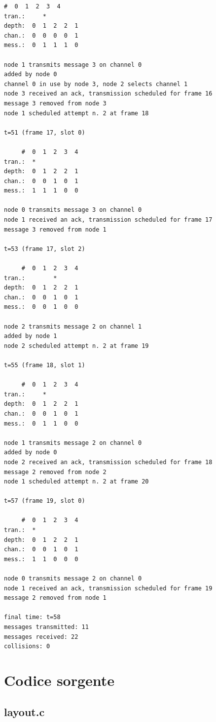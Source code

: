 \documentclass[a4paper,12pt]{article}
\theoremstyle{definition}
\begin{document}
\begin{Verbatim}[fontsize=\footnotesize]
     #  0  1  2  3  4 
tran.:     *          
depth:  0  1  2  2  1 
chan.:  0  0  0  0  1 
mess.:  0  1  1  1  0 

node 1 transmits message 3 on channel 0
added by node 0
channel 0 in use by node 3, node 2 selects channel 1
node 3 received an ack, transmission scheduled for frame 16
message 3 removed from node 3
node 1 scheduled attempt n. 2 at frame 18

t=51 (frame 17, slot 0)

     #  0  1  2  3  4 
tran.:  *             
depth:  0  1  2  2  1 
chan.:  0  0  1  0  1 
mess.:  1  1  1  0  0 

node 0 transmits message 3 on channel 0
node 1 received an ack, transmission scheduled for frame 17
message 3 removed from node 1

t=53 (frame 17, slot 2)

     #  0  1  2  3  4 
tran.:        *       
depth:  0  1  2  2  1 
chan.:  0  0  1  0  1 
mess.:  0  0  1  0  0 

node 2 transmits message 2 on channel 1
added by node 1
node 2 scheduled attempt n. 2 at frame 19

t=55 (frame 18, slot 1)

     #  0  1  2  3  4 
tran.:     *          
depth:  0  1  2  2  1 
chan.:  0  0  1  0  1 
mess.:  0  1  1  0  0 

node 1 transmits message 2 on channel 0
added by node 0
node 2 received an ack, transmission scheduled for frame 18
message 2 removed from node 2
node 1 scheduled attempt n. 2 at frame 20

t=57 (frame 19, slot 0)

     #  0  1  2  3  4 
tran.:  *             
depth:  0  1  2  2  1 
chan.:  0  0  1  0  1 
mess.:  1  1  0  0  0 

node 0 transmits message 2 on channel 0
node 1 received an ack, transmission scheduled for frame 19
message 2 removed from node 1

final time: t=58
messages transmitted: 11
messages received: 22
collisions: 0
\end{Verbatim}

\appendix
\section{Codice sorgente}

\subsection{layout.c}

\end{document}
